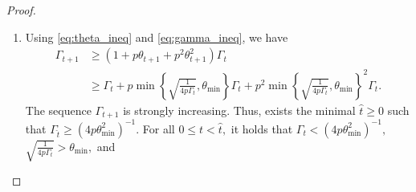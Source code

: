 \documentclass{article} %
\theoremstyle{plain}
\theoremstyle{definition}
\theoremstyle{remark}
\newcommand{\eqdef}{:=}
\begin{document}
\begin{proof}
\begin{enumerate}
\begin{align*}
  \bar{\theta}_{t+1} \geq \frac{\sqrt{4 \bar{L} p \left(\bar{L} + \Gamma_{t} \mu\right) \Gamma_{t}}}{4 \bar{L} p \Gamma_t} = \sqrt{\frac{\left(\bar{L} + \Gamma_{t} \mu\right)}{4 \bar{L} p \Gamma_t}} \geq \max\left\{\sqrt{\frac{1}{4 p \Gamma_t}}, \sqrt{\frac{\mu}{4 p \bar{L}}}\right\}
\end{align*}
and
\begin{align}
  \label{eq:theta_ineq}
  \theta_{t+1} \geq \min\left\{\max\left\{\sqrt{\frac{1}{4 p \Gamma_t}}, \sqrt{\frac{\mu}{4 p \bar{L}}}\right\}, \theta_{\min}\right\}.
\end{align}
Next, since $p \theta_{t+1} \in [0, \nicefrac{1}{4}],$ we have
\begin{align}
  \label{eq:gamma_ineq}
  \gamma_{t+1} \eqdef p \theta_{t+1} \Gamma_t / (1 - p \theta_{t+1}) \geq p \theta_{t+1} \Gamma_t \left(1 + p \theta_{t+1}\right)
\end{align}
and
\begin{align*}
  \Gamma_{t+1} \eqdef \Gamma_t + \gamma_{t+1} \geq \left(1 + p \theta_{t+1} + p^2 \theta_{t+1}^2\right) \Gamma_t.
\end{align*}
Using \eqref{eq:theta_ineq} and \eqref{eq:gamma_ineq}, we obtain
\begin{equation}
\begin{aligned}
  \label{eq:gamma_ineq_1}
  \Gamma_{t+1} &\geq \left(1 + p \min\left\{\sqrt{\frac{\mu}{4 p \bar{L}}}, \theta_{\min}\right\}\right) \Gamma_t = \left(1 + \min\left\{\sqrt{\frac{p \mu}{4 \bar{L}}}, p\theta_{\min}\right\}\right) \Gamma_t \\
  &\geq \Gamma_0 \left(1 + \min\left\{\sqrt{\frac{p \mu}{4 \bar{L}}}, p\theta_{\min}\right\}\right)^{t + 1} \geq \frac{\Gamma_0}{2}\exp\left((t + 1) \min\left\{\sqrt{\frac{p \mu}{4 \bar{L}}}, p\theta_{\min}\right\}\right),
\end{aligned}
\end{equation}
where we use that $1 + x \geq e^x / 2$ for all $x \in [0, 1].$ 
\item
Using \eqref{eq:theta_ineq} and \eqref{eq:gamma_ineq}, we have
\begin{align*}
  \Gamma_{t+1} &\geq \left(1 + p \theta_{t+1} + p^2 \theta_{t+1}^2\right) \Gamma_t \\
  &\geq \Gamma_t + p\min\left\{\sqrt{\frac{1}{4 p \Gamma_t}}, \theta_{\min}\right\} \Gamma_t + p^2\min\left\{\sqrt{\frac{1}{4 p \Gamma_t}}, \theta_{\min}\right\}^2 \Gamma_t.
\end{align*}
The sequence $\Gamma_{t+1}$ is strongly increasing. Thus, exists the minimal $\widehat{t} \geq 0$ such that $\Gamma_{\widehat{t}} \geq (4 p \theta_{\min}^2)^{-1}.$ For all $0 \leq t < \widehat{t},$ it holds that $\Gamma_{t} < (4 p \theta_{\min}^2)^{-1},$ $\sqrt{\frac{1}{4 p \Gamma_t}} > \theta_{\min},$ and 

\end{enumerate}
\end{proof}
\end{document}
